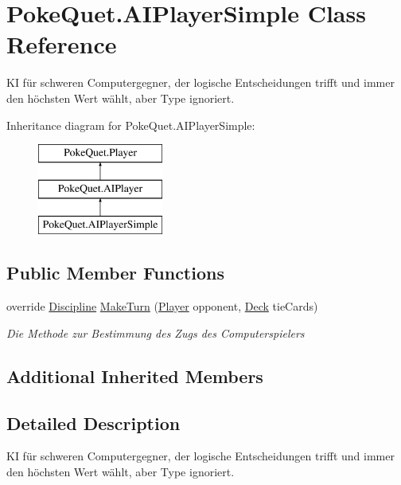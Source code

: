 \hypertarget{class_poke_quet_1_1_a_i_player_simple}{}\section{Poke\+Quet.\+A\+I\+Player\+Simple Class Reference}
\label{class_poke_quet_1_1_a_i_player_simple}


KI für schweren Computergegner, der logische Entscheidungen trifft und immer den höchsten Wert wählt, aber Type ignoriert.  


Inheritance diagram for Poke\+Quet.\+A\+I\+Player\+Simple\+:\begin{figure}[H]
\begin{center}
\leavevmode
\includegraphics[height=3.000000cm]{class_poke_quet_1_1_a_i_player_simple}
\end{center}
\end{figure}
\subsection*{Public Member Functions}
\begin{DoxyCompactItemize}
\item 
override \mbox{\hyperlink{namespace_poke_quet_aa425f1b8cf90847021fe1177d6a7199d}{Discipline}} \mbox{\hyperlink{class_poke_quet_1_1_a_i_player_simple_a4c48360666f3fc8b7400cbfa2c7ea29e}{Make\+Turn}} (\mbox{\hyperlink{class_poke_quet_1_1_player}{Player}} opponent, \mbox{\hyperlink{class_poke_quet_1_1_deck}{Deck}} tie\+Cards)
\begin{DoxyCompactList}\small\item\em Die Methode zur Bestimmung des Zugs des Computerspielers \end{DoxyCompactList}\end{DoxyCompactItemize}
\subsection*{Additional Inherited Members}


\subsection{Detailed Description}
KI für schweren Computergegner, der logische Entscheidungen trifft und immer den höchsten Wert wählt, aber Type ignoriert. 



